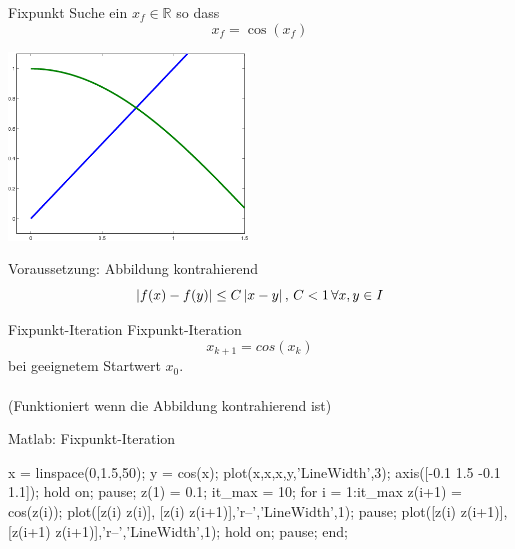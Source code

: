 \documentclass[hyperref={xetex}]{beamer}
\begin{document}
%
%
\begin{frame}[fragile]{Fixpunkt}
Suche ein $x_f \in \mathbb{R}$ so dass
\[ x_f = \cos (x_f ) \]
\begin{center}
\includegraphics[height=5cm]{figures/fixpunkt}
\end{center}
Voraussetzung: Abbildung kontrahierend 
\[
\left\lvert f(x)-f(y)\right\rvert \leq C \left\lvert x-y\right\rvert,\, C < 1\,  \forall  x,y \in  I
\]

\end{frame}
%
%
\begin{frame}[fragile]{Fixpunkt-Iteration}
Fixpunkt-Iteration 
\[ x_{k+1}=cos(x_k) \]
bei geeignetem Startwert $x_0$.  \\
\\
(Funktioniert wenn die Abbildung kontrahierend ist)
\end{frame}

%
%
\begin{frame}[fragile]{Matlab: Fixpunkt-Iteration}
\begin{matlabin}
x = linspace(0,1.5,50);
y = cos(x);
plot(x,x,x,y,'LineWidth',3);
axis([-0.1 1.5 -0.1 1.1]);
hold on;
pause; %
z(1) = 0.1; %
it_max = 10; %
for i = 1:it_max
    z(i+1) = cos(z(i));
    plot([z(i) z(i)], [z(i) z(i+1)],'r--','LineWidth',1);
    pause;
    plot([z(i) z(i+1)],[z(i+1) z(i+1)],'r--','LineWidth',1);
    hold on;
    pause; %
end;
\end{matlabin}
\end{frame}
\end{document}
